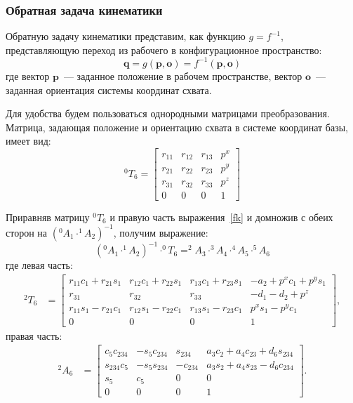 \subsubsection{Обратная задача кинематики}\label{part_kinematics_inverse}

Обратную задачу кинематики представим, как функцию $g = f^{-1}$, представляющую переход из рабочего в конфигурационное пространство:
\begin{equation}
\textbf{q} = g(\textbf{p}, \textbf{o}) = f^{-1}(\textbf{p}, \textbf{o})
\end{equation}
где вектор $\textbf{p}$~--- заданное положение в рабочем пространстве, вектор $\textbf{o}$~--- заданная ориентация системы координат схвата.

Для удобства будем пользоваться однородными матрицами преобразования.
Матрица, задающая положение и ориентацию схвата в системе координат базы, имеет вид:
\begin{equation}\label{ik}
	^0T_6 =
	\left[\begin{matrix}
	r_{11} & r_{12} & r_{13} & p^{x}\\
	r_{21} & r_{22} & r_{23} & p^{y}\\
	r_{31} & r_{32} & r_{33} & p^{z}\\
	0 & 0 & 0 & 1
	\end{matrix}\right]
\end{equation}

Приравняв матрицу $^0T_6$ и правую часть выражения~\eqref{fk} и домножив с обеих сторон на $(^0A_1 \cdot ^1A_2)^{-1}$, получим выражение:
\begin{equation}
	(^0A_1 \cdot ^1A_2)^{-1} \cdot ^0T_6 = ^2A_3 \cdot ^3A_4 \cdot ^4A_5 \cdot ^5A_6
\end{equation}
где левая часть:
\begin{align*}
	^2T_6 &= 
	\left[\begin{matrix}
		r_{11} c_{1} + r_{21} s_{1} & r_{12} c_{1} + r_{22} s_{1} & r_{13} c_{1} + r_{23} s_{1} & - a_{2} + p^{x} c_{1} + p^{y} s_{1}\\
		r_{31} & r_{32} & r_{33} & - d_{1} - d_{2} + p^{z}\\
		r_{11} s_{1} - r_{21} c_{1} & r_{12} s_{1} - r_{22} c_{1} & r_{13} s_{1} - r_{23} c_{1} & p^{x} s_{1} - p^{y} c_{1}\\
		0 & 0 & 0 & 1\end{matrix}\right],
\end{align*}
правая часть:
\begin{align*}
	^2A_6 &=
	\left[\begin{matrix}
		c_{5} c_{234} & - s_{5} c_{234} & s_{234} & a_{3} c_{2} + a_{4} c_{23} + d_{6} s_{234}\\
		s_{234} c_{5} & - s_{5} s_{234} & - c_{234} & a_{3} s_{2} + a_{4} s_{23} - d_{6} c_{234}\\
		s_{5} & c_{5} & 0 & 0\\
		0 & 0 & 0 & 1
	\end{matrix}\right].
\end{align*}

